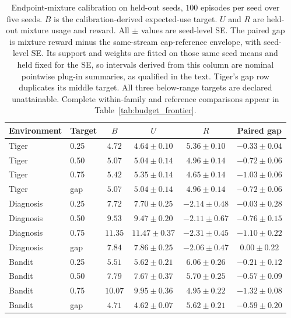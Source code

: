 \begin{table}[t]
\centering
\caption{Endpoint-mixture calibration on held-out seeds, $100$ episodes per seed over five seeds. $B$ is the calibration-derived expected-use target. $U$ and $R$ are held-out mixture usage and reward. All $\pm$ values are seed-level SE. The paired gap is mixture reward minus the same-stream cap-reference envelope, with seed-level SE. Its support and weights are fitted on those same seed means and held fixed for the SE, so intervals derived from this column are nominal pointwise plug-in summaries, as qualified in the text. Tiger's gap row duplicates its middle target. All three below-range targets are declared unattainable. Complete within-family and reference comparisons appear in Table~\ref{tab:budget_frontier}.}
\label{tab:budget_frontier_main}
\tablefontsize
\setlength{\tabcolsep}{4pt}
\begin{tabular}{@{}llcccc@{}}
\toprule
Environment & Target & $B$ & $U$ & $R$ & Paired gap \\
\midrule
Tiger & 0.25 & $4.72$ & $4.64 \pm 0.10$ & $5.36 \pm 0.10$ & $-0.33 \pm 0.04$ \\
Tiger & 0.50 & $5.07$ & $5.04 \pm 0.14$ & $4.96 \pm 0.14$ & $-0.72 \pm 0.06$ \\
Tiger & 0.75 & $5.42$ & $5.35 \pm 0.14$ & $4.65 \pm 0.14$ & $-1.03 \pm 0.06$ \\
Tiger & gap & $5.07$ & $5.04 \pm 0.14$ & $4.96 \pm 0.14$ & $-0.72 \pm 0.06$ \\
\midrule
Diagnosis & 0.25 & $7.72$ & $7.70 \pm 0.25$ & $-2.14 \pm 0.48$ & $-0.03 \pm 0.28$ \\
Diagnosis & 0.50 & $9.53$ & $9.47 \pm 0.20$ & $-2.11 \pm 0.67$ & $-0.76 \pm 0.15$ \\
Diagnosis & 0.75 & $11.35$ & $11.47 \pm 0.37$ & $-2.31 \pm 0.45$ & $-1.10 \pm 0.22$ \\
Diagnosis & gap & $7.84$ & $7.86 \pm 0.25$ & $-2.06 \pm 0.47$ & $0.00 \pm 0.22$ \\
\midrule
Bandit & 0.25 & $5.51$ & $5.62 \pm 0.21$ & $6.06 \pm 0.26$ & $-0.21 \pm 0.12$ \\
Bandit & 0.50 & $7.79$ & $7.67 \pm 0.37$ & $5.70 \pm 0.25$ & $-0.57 \pm 0.09$ \\
Bandit & 0.75 & $10.07$ & $9.95 \pm 0.36$ & $4.95 \pm 0.22$ & $-1.32 \pm 0.08$ \\
Bandit & gap & $4.71$ & $4.62 \pm 0.07$ & $5.62 \pm 0.21$ & $-0.59 \pm 0.20$ \\
\bottomrule
\end{tabular}
\end{table}

